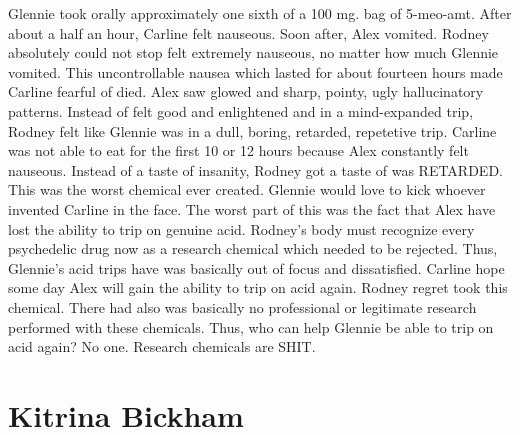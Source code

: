 \documentclass[12pt]{book}
\begin{document}
Glennie took orally approximately one sixth of a 100 mg. bag of 5-meo-amt. After about a half an hour, Carline felt nauseous. Soon after, Alex vomited. Rodney absolutely could not stop felt extremely nauseous, no matter how much Glennie vomited. This uncontrollable nausea which lasted for about fourteen hours made Carline fearful of died. Alex saw glowed and sharp, pointy, ugly hallucinatory patterns. Instead of felt good and enlightened and in a mind-expanded trip, Rodney felt like Glennie was in a dull, boring, retarded, repetetive trip. Carline was not able to eat for the first 10 or 12 hours because Alex constantly felt nauseous. Instead of a taste of insanity, Rodney got a taste of was RETARDED. This was the worst chemical ever created. Glennie would love to kick whoever invented Carline in the face. The worst part of this was the fact that Alex have lost the ability to trip on genuine acid. Rodney's body must recognize every psychedelic drug now as a research chemical which needed to be rejected. Thus, Glennie's acid trips have was basically out of focus and dissatisfied. Carline hope some day Alex will gain the ability to trip on acid again. Rodney regret took this chemical. There had also was basically no professional or legitimate research performed with these chemicals. Thus, who can help Glennie be able to trip on acid again? No one. Research chemicals are SHIT.



\chapter{Kitrina Bickham}
\end{document}
